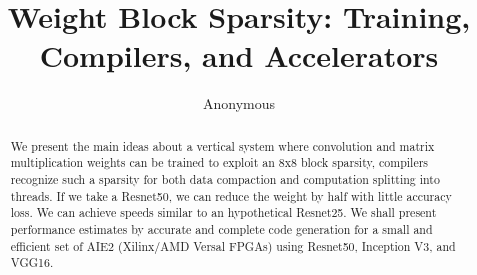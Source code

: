 \documentclass[sigconf]{acmart}
\begin{document}
\title{Weight Block Sparsity: Training, Compilers, and Accelerators}

\author{Anonymous} 

\renewcommand{\shortauthors}{ Anonymous  et al.}

\begin{abstract}
We present the main ideas about a vertical system where convolution
and matrix multiplication weights can be trained to exploit an 8x8
block sparsity, compilers recognize such a sparsity for both data
compaction and computation splitting into threads. If we take a
Resnet50, we can reduce the weight by half with little accuracy
loss. We can achieve speeds similar to an hypothetical Resnet25. We
shall present performance estimates by accurate and complete code
generation for a small and efficient set of AIE2 (Xilinx/AMD Versal
FPGAs) using Resnet50, Inception V3, and VGG16.
\end{abstract}



\end{document}
